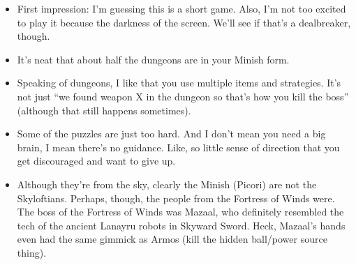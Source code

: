 \newpage

\etocsettocstyle{}{}
\localtableofcontents


\newpage
{}



\newpage
{}



\newpage
{}
\begin{itemize}
	\item{First impression: I'm guessing this is a short game. Also, I'm not too excited to play it because the darkness of the screen. We'll see if that's a dealbreaker, though.}
	\item{It's neat that about half the dungeons are in your Minish form.}
	\item{Speaking of dungeons, I like that you use multiple items and strategies. It's not just ``we found weapon X in the dungeon so that's how you kill the boss'' (although that still happens sometimes).}
	\item{Some of the puzzles are just too hard. And I don't mean you need a big brain, I mean there's no guidance. Like, so little sense of direction that you get discouraged and want to give up.}
\end{itemize}


\newpage
{}
\begin{itemize}
	\item{Although they're from the sky, clearly the Minish (Picori) are not the Skyloftians. Perhaps, though, the people from the Fortress of Winds were. The boss of the Fortress of Winds was Mazaal, who definitely resembled the tech of the ancient Lanayru robots in Skyward Sword.
	Heck, Mazaal's hands even had the same gimmick as Armos (kill the hidden ball/power source thing).
	}
\end{itemize}



